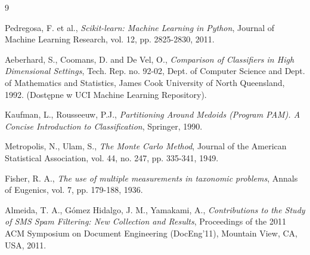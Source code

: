 \documentclass[12pt, a4paper]{article}
\begin{document}
\newpage
\begin{thebibliography}{9}

Pedregosa, F. et al., \textit{Scikit-learn: Machine Learning in Python}, Journal of Machine Learning Research, vol. 12, pp. 2825-2830, 2011.

Aeberhard, S., Coomans, D. and De Vel, O., \textit{Comparison of Classifiers in High Dimensional Settings}, Tech. Rep. no. 92-02, Dept. of Computer Science and Dept. of Mathematics and Statistics, James Cook University of North Queensland, 1992. (Dostępne w UCI Machine Learning Repository).

Kaufman, L., Rousseeuw, P.J., \textit{Partitioning Around Medoids (Program PAM). A Concise Introduction to Classification}, Springer, 1990.

Metropolis, N., Ulam, S., \textit{The Monte Carlo Method}, Journal of the American Statistical Association, vol. 44, no. 247, pp. 335-341, 1949.

Fisher, R. A., \textit{The use of multiple measurements in taxonomic problems}, Annals of Eugenics, vol. 7, pp. 179-188, 1936.

Almeida, T. A., Gómez Hidalgo, J. M., Yamakami, A., \textit{Contributions to the Study of SMS Spam Filtering: New Collection and Results}, Proceedings of the 2011 ACM Symposium on Document Engineering (DocEng'11), Mountain View, CA, USA, 2011.

\end{thebibliography}
\end{document}
